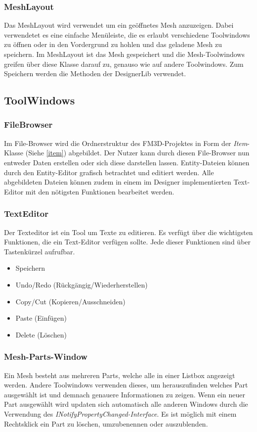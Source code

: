 \subsubsection{MeshLayout}
Das MeshLayout wird verwendet um ein geöffnetes Mesh anzuzeigen. Dabei verwendetet es eine einfache Menüleiste, die es erlaubt verschiedene Toolwindows zu öffnen oder in den Vordergrund zu hohlen und das geladene Mesh zu speichern. Im MeshLayout ist das Mesh gespeichert und die Mesh-Toolwindows greifen über diese Klasse darauf zu, genauso wie auf andere Toolwindows. Zum Speichern werden die Methoden der DesignerLib verwendet.

\subsection{ToolWindows}
\subsubsection{FileBrowser}
\label{filebrowser}
Im File-Browser wird die Ordnerstruktur des FM3D-Projektes in Form der \textit{Item}-Klasse (Siehe \cref{item}) abgebildet. Der Nutzer kann durch diesen File-Browser nun entweder Daten erstellen oder sich diese darstellen lassen. Entity-Dateien können durch den Entity-Editor grafisch betrachtet und editiert werden. Alle abgebildeten Dateien können zudem in einem im Designer implementierten Text-Editor mit den nötigsten Funktionen bearbeitet werden.

\subsubsection{TextEditor}
Der Texteditor ist ein Tool um Texte zu editieren.  Es verfügt über die wichtigsten Funktionen, die ein Text-Editor verfügen sollte. Jede dieser Funktionen sind über Tastenkürzel aufrufbar.
\begin{itemize}
	\item Speichern
	\item Undo/Redo (Rückgängig/Wiederherstellen)
	\item Copy/Cut (Kopieren/Ausschneiden)
	\item Paste (Einfügen)
	\item Delete (Löschen)
\end{itemize}

\subsubsection{Mesh-Parts-Window}
Ein Mesh besteht aus mehreren Parts, welche alle in einer Listbox angezeigt werden. Andere Toolwindows verwenden dieses, um herauszufinden welches Part ausgewählt ist und demnach genauere Informationen zu zeigen. Wenn ein neuer Part ausgewählt wird updaten sich automatisch alle anderen Windows durch die Verwendung des \textit{INotifyPropertyChanged-Interface}. Es ist möglich mit einem Rechtsklick ein Part zu löschen, umzubenennen oder auszublenden.

